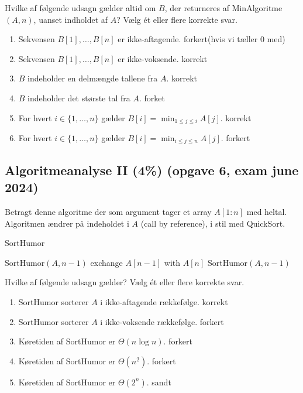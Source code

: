 \documentclass{article}
\theoremstyle{definition}
\begin{document}
Hvilke af følgende udsagn gælder altid om $B$, der returneres af MinAlgoritme$(A,n)$, uanset indholdet af $A$? Vælg ét eller flere korrekte svar.

\begin{enumerate}
    \item Sekvensen $B[1],\ldots,B[n]$ er ikke-aftagende. forkert(hvis vi tæller 0 med)
    \item Sekvensen $B[1],\ldots,B[n]$ er ikke-voksende. korrekt
    \item $B$ indeholder en delmængde tallene fra $A$. korrekt
    \item $B$ indeholder det største tal fra $A$. forket
    \item For hvert $i \in \{1,\ldots,n\}$ gælder $B[i] = \min_{1\leq j\leq i} A[j]$. korrekt
    \item For hvert $i \in \{1,\ldots,n\}$ gælder $B[i] = \min_{i\leq j\leq n} A[j]$. forkert
\end{enumerate}

\subsection{Algoritmeanalyse II (4\%) (opgave 6, exam june 2024)}
Betragt denne algoritme der som argument tager et array $A[1:n]$ med heltal. Algoritmen ændrer på indeholdet i $A$ (call by reference), i stil med QuickSort.

\begin{algorithm}
\caption{SortHumor}
\begin{algorithmic}[1]
    \State SortHumor$(A, n-1)$
        \State exchange $A[n-1]$ with $A[n]$
    \EndIf
    \State SortHumor$(A, n-1)$
\EndIf
\end{algorithmic}
\end{algorithm}

Hvilke af følgende udsagn gælder? Vælg ét eller flere korrekte svar.
\begin{enumerate}
    \item SortHumor sorterer $A$ i ikke-aftagende rækkefølge. korrekt
    \item SortHumor sorterer $A$ i ikke-voksende rækkefølge. forkert
    \item Køretiden af SortHumor er $\Theta(n\log n)$. forkert 
    \item Køretiden af SortHumor er $\Theta(n^2)$. forkert
    \item Køretiden af SortHumor er $\Theta(2^n)$. sandt
\end{enumerate}
\end{document}

